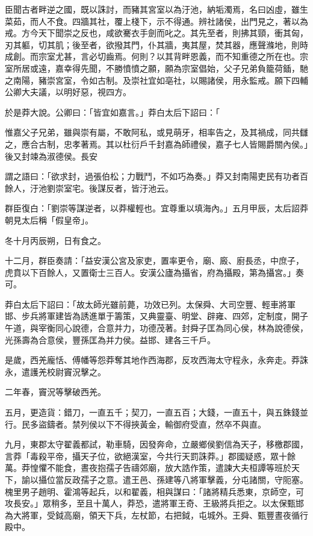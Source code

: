 \begin{pinyinscope}
臣聞古者畔逆之國，既以誅討，而豬其宮室以為汙池，納垢濁焉，名曰凶虛，雖生菜茹，而人不食。四牆其社，覆上棧下，示不得通。辨社諸侯，出門見之，著以為戒。方今天下聞崇之反也，咸欲騫衣手劍而叱之。其先至者，則拂其頸，衝其匈，刃其軀，切其肌；後至者，欲撥其門，仆其牆，夷其屋，焚其器，應聲滌地，則時成創。而宗室尤甚，言必切齒焉。何則？以其背畔恩義，而不知重德之所在也。宗室所居或遠，嘉幸得先聞，不勝憤憤之願，願為宗室倡始，父子兄弟負籠荷鍤，馳之南陽，豬崇宮室，令如古制。及崇社宜如亳社，以賜諸侯，用永監戒。願下四輔公卿大夫議，以明好惡，視四方。

於是莽大說。公卿曰：「皆宜如嘉言。」莽白太后下詔曰：「

惟嘉父子兄弟，雖與崇有屬，不敢阿私，或見萌牙，相率告之，及其禍成，同共讎之，應合古制，忠孝著焉。其以杜衍戶千封嘉為師禮侯，嘉子七人皆賜爵關內侯。」後又封竦為淑德侯。長安

謂之語曰：「欲求封，過張伯松；力戰鬥，不如巧為奏。」莽又封南陽吏民有功者百餘人，汙池劉崇室宅。後謀反者，皆汙池云。

群臣復白：「劉崇等謀逆者，以莽權輕也。宜尊重以填海內。」五月甲辰，太后詔莽朝見太后稱「假皇帝」。

冬十月丙辰朔，日有食之。

十二月，群臣奏請：「益安漢公宮及家吏，置率更令，廟、廄、廚長丞，中庶子，虎賁以下百餘人，又置衛士三百人。安漢公廬為攝省，府為攝殿，第為攝宮。」奏可。

莽白太后下詔曰：「故太師光雖前薨，功效已列。太保舜、大司空豐、輕車將軍邯、步兵將軍建皆為誘進單于籌策，又典靈臺、明堂、辟雍、四郊，定制度，開子午道，與宰衡同心說德，合意并力，功德茂著。封舜子匡為同心侯，林為說德侯，光孫壽為合意侯，豐孫匡為并力侯。益邯、建各三千戶。

是歲，西羌龐恬、傅幡等怨莽奪其地作西海郡，反攻西海太守程永，永奔走。莽誅永，遣護羌校尉竇況擊之。

二年春，竇況等擊破西羌。

五月，更造貨：錯刀，一直五千；契刀，一直五百；大錢，一直五十，與五銖錢並行。民多盜鑄者。禁列侯以下不得挾黃金，輸御府受直，然卒不與直。

九月，東郡太守翟義都試，勒車騎，因發奔命，立嚴鄉侯劉信為天子，移檄郡國，言莽「毒殺平帝，攝天子位，欲絕漢室，今共行天罰誅莽。」郡國疑惑，眾十餘萬。莽惶懼不能食，晝夜抱孺子告禱郊廟，放大誥作策，遣諫大夫桓譚等班於天下，諭以攝位當反政孺子之意。遣王邑、孫建等八將軍擊義，分屯諸關，守阨塞。槐里男子趙明、霍鴻等起兵，以和翟義，相與謀曰：「諸將精兵悉東，京師空，可攻長安。」眾稍多，至且十萬人，莽恐，遣將軍王奇、王級將兵拒之。以太保甄邯為大將軍，受鉞高廟，領天下兵，左杖節，右把鉞，屯城外。王舜、甄豐晝夜循行殿中。


\end{pinyinscope}
